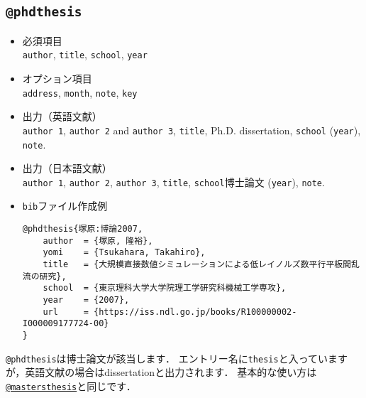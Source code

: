 \documentclass[a4paper,fleqn,uplatex,dvipdfmx]{jsarticle}
\makeatletter
\newcommand{\ttmastersthesis}{\texttt{@mastersthesis}}
\newcommand{\ttphdthesis}{\texttt{@phdthesis}}
\makeatother
\begin{document}
\subsection{\ttphdthesis}
\label{ssec:phdthesis}
\begin{screen}
    \begin{itemize}
        \item 必須項目 \\
        \verb|author|, \verb|title|, \verb|school|, \verb|year|
        \item オプション項目 \\
        \verb|address|, \verb|month|, \verb|note|, \verb|key|
        \item 出力（英語文献） \\
            \colorbox[gray]{0.8}{\texttt{author 1}}, \colorbox[gray]{0.8}{\texttt{author 2}} and \colorbox[gray]{0.8}{\texttt{author 3}}, \colorbox[gray]{0.8}{\texttt{title}}, Ph.D. dissertation, \colorbox[gray]{0.8}{\texttt{school}} (\colorbox[gray]{0.8}{\texttt{year}}), \colorbox[gray]{0.8}{\texttt{note}}.
        \item 出力（日本語文献） \\
            \colorbox[gray]{0.8}{\texttt{author 1}}, \colorbox[gray]{0.8}{\texttt{author 2}}, \colorbox[gray]{0.8}{\texttt{author 3}}, \colorbox[gray]{0.8}{\texttt{title}}, \colorbox[gray]{0.8}{\texttt{school}}博士論文 (\colorbox[gray]{0.8}{\texttt{year}}), \colorbox[gray]{0.8}{\texttt{note}}.
        \item \verb|bib|ファイル作成例 \vspace{-3mm}
\begin{verbatim}
@phdthesis{塚原:博論2007,
    author  = {塚原, 隆裕},
    yomi    = {Tsukahara, Takahiro},
    title   = {大規模直接数値シミュレーションによる低レイノルズ数平行平板間乱流の研究},
    school  = {東京理科大学大学院理工学研究科機械工学専攻},
    year    = {2007},
    url     = {https://iss.ndl.go.jp/books/R100000002-I000009177724-00}
}
\end{verbatim}
    \end{itemize}
\end{screen}

\ttphdthesis は博士論文が該当します．
エントリー名に\verb|thesis|と入っていますが，英語文献の場合はdissertationと出力されます．
基本的な使い方は\hyperref[ssec:mastersthesis]{\ttmastersthesis}と同じです．
\end{document}
